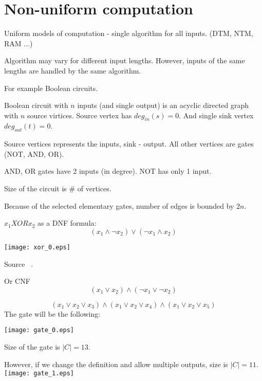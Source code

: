 \section{\texorpdfstring{Non-uniform computation}{Non-uniform computation}}
\vspace{5mm}
\large

\begin{definition}
	Uniform models of computation - single algorithm for all inputs. (DTM, NTM, RAM ...)
\end{definition}

\begin{definition}
	Algorithm may vary for different input lengths.
	However, inputs of the same lengths are handled by the same algorithm.

	For example Boolean circuits.
\end{definition}

\begin{definition}
	Boolean circuit with $n$ inputs (and single output) is an acyclic directed graph with $n$ source virtices.
	Source vertex has $deg_{in}(s) = 0$.
	And single sink vertex $deg_{out}(t) = 0$.

	Source vertices represents the inputs, sink - output.
	All other vertices are gates (NOT, AND, OR).

	AND, OR gates have 2 inputs (in degree).
	NOT has only 1 input.

	Size of the circuit is \# of vertices.
\end{definition}

\begin{note}
	Because of the selected elementary gates, number of edges is bounded by $2n$.
\end{note}

\begin{example}
	$x_1 XOR x_2$ as a DNF formula:
	\[ (x_1 \land \neg x_2) \lor (\neg x_1 \land x_2) \]

	\texttt{[image: xor\_0.eps]}

	Source ~\cite{arora2009computational}.

	Or CNF
	\[ (x_1 \lor x_2) \land (\neg x_1 \lor \neg x_2) \]
\end{example}

\begin{example}
	\[ (x_1 \lor x_2 \lor x_3) \land (x_1 \lor x_2 \lor x_4) \land (x_1 \lor x_2 \lor x_5) \]
	The gate will be the following:

	\texttt{[image: gate\_0.eps]}

	Size of the gate is $|C| = 13$.

	However, if we change the definition and allow multiple outputs, size is $|C| = 11$.
	\texttt{[image: gate\_1.eps]}
\end{example}

